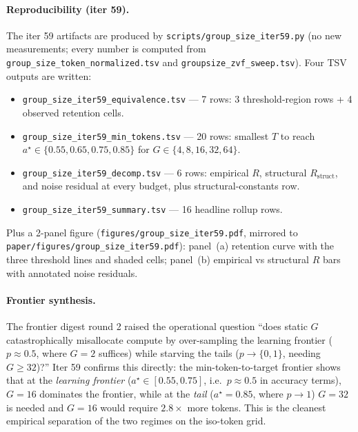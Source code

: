 \paragraph{Reproducibility (iter 59).}
The iter 59 artifacts are produced by
\texttt{scripts/group\_size\_iter59.py} (no new measurements; every
number is computed from \texttt{group\_size\_token\_normalized.tsv}
and \texttt{groupsize\_zvf\_sweep.tsv}).  Four TSV outputs are
written:
\begin{itemize}
  \item \texttt{group\_size\_iter59\_equivalence.tsv} --- 7 rows: 3
        threshold-region rows + 4 observed retention cells.
  \item \texttt{group\_size\_iter59\_min\_tokens.tsv} --- 20 rows:
        smallest $T$ to reach $a^\star \in \{0.55, 0.65, 0.75, 0.85\}$
        for $G \in \{4, 8, 16, 32, 64\}$.
  \item \texttt{group\_size\_iter59\_decomp.tsv} --- 6 rows:
        empirical $R$, structural $R_{\mathrm{struct}}$, and noise
        residual at every budget, plus structural-constants row.
  \item \texttt{group\_size\_iter59\_summary.tsv} --- 16 headline
        rollup rows.
\end{itemize}
Plus a 2-panel figure (\texttt{figures/group\_size\_iter59.pdf},
mirrored to \texttt{paper/figures/group\_size\_iter59.pdf}):
panel~(a) retention curve with the three threshold lines and shaded
cells; panel~(b) empirical vs structural $R$ bars with annotated
noise residuals.

\paragraph{Frontier synthesis.}
The frontier digest round 2 raised the operational question
``does static $G$ catastrophically misallocate compute by
over-sampling the learning frontier ($p \approx 0.5$, where
$G{=}2$ suffices) while starving the tails ($p \to \{0, 1\}$,
needing $G \geq 32$)?''  Iter 59 confirms this directly: the
min-token-to-target frontier shows that at the
\emph{learning frontier} ($a^\star \in [0.55, 0.75]$, i.e.\
$p \approx 0.5$ in accuracy terms), $G{=}16$ dominates the
frontier, while at the \emph{tail} ($a^\star = 0.85$, where
$p \to 1$) $G{=}32$ is needed and $G{=}16$ would require
$2.8 \times$ more tokens.  This is the cleanest empirical
separation of the two regimes on the iso-token grid.